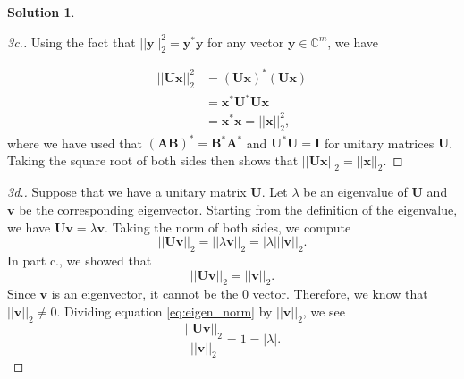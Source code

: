 \documentclass[12pt]{article}
\newcommand{\bbC}{\mathbb{C}}
\newcommand{\abs}[1]{ \left| #1 \right| }
\newcommand{\norm}[1]{ \left|\left| #1 \right|\right| }
\renewcommand{\vec}[1]{\mathbf{#1}}
\theoremstyle{definition}
\newtheorem{sol}{Solution}
\theoremstyle{remark}
\begin{document}
\begin{sol}
\begin{proof}[3c.]
Using the fact that $\norm{\vec{y}}_2^2 = \vec{y}^*\vec{y}$ for any vector $\vec{y}\in\bbC^m$, we have

\begin{align}
    \norm{ \vec{Ux} }_2^2 &= (\vec{Ux})^*(\vec{Ux}) \\
                          &= \vec{x}^*\vec{U}^*\vec{Ux} \\
                          &= \vec{x}^*\vec{x} = \norm{\vec{x}}_2^2,
\end{align}
where we have used that $(\vec{AB})^* = \vec{B}^*\vec{A}^*$ and $\vec{U}^*\vec{U} = \vec{I}$ for unitary matrices $\vec{U}$.
Taking the square root of both sides then shows that $\norm{ \vec{Ux} }_2 = \norm{\vec{x}}_2$.
\end{proof}

\begin{proof}[3d.]
    Suppose that we have a unitary matrix $\vec{U}$. Let $\lambda$ be an eigenvalue of $\vec{U}$ and $\vec{v}$ be the corresponding eigenvector. Starting from the definition of the eigenvalue, we have $\vec{Uv} = \lambda \vec{v}$. Taking the norm of both sides, we compute
    \begin{equation}\label{eq:eigen_norm}
    \norm{\vec{Uv}}_2 = \norm{\lambda\vec{v}}_2 = \abs{\lambda} \norm{\vec{v}}_2.
\end{equation}
In part c., we showed that
\begin{equation}
    \norm{\vec{Uv}}_2 = \norm{\vec{v}}_2.
\end{equation}
Since $\vec{v}$ is an eigenvector, it cannot be the 0 vector. Therefore, we know that $\norm{\vec{v}}_2 \neq 0$. Dividing equation \ref{eq:eigen_norm} by $\norm{\vec{v}}_2$, we see
\begin{equation}
    \frac{\norm{\vec{Uv}}_2}{\norm{\vec{v}}_2} = 1 = \abs{\lambda}.
\end{equation}
\end{proof}
\end{sol}
\end{document}
